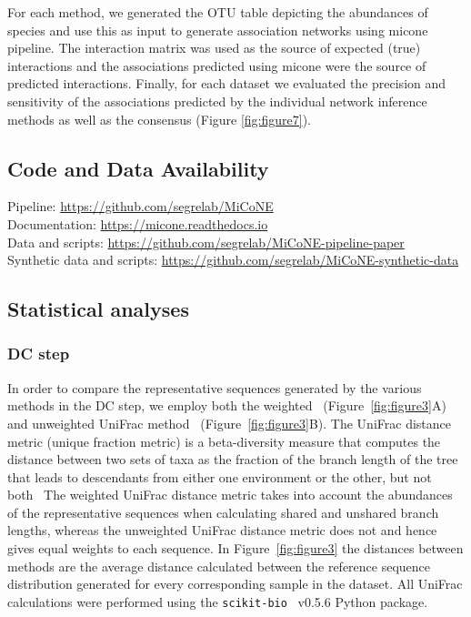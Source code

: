   For each method, we generated the OTU table depicting the abundances of species and use this as input to generate association networks using \ac{micone} pipeline.
  The interaction matrix was used as the source of expected (true) interactions and the associations predicted using \ac{micone} were the source of predicted interactions.
  Finally, for each dataset we evaluated the precision and sensitivity of the associations predicted by the individual network inference methods as well as the consensus (Figure \ref{fig:figure7}).

  \subsection*{Code and Data Availability}
  Pipeline: \href{https://github.com/segrelab/MiCoNE}{https://github.com/segrelab/MiCoNE} \\
  Documentation: \href{https://micone.readthedocs.io}{https://micone.readthedocs.io} \\
  Data and scripts: \href{https://github.com/segrelab/MiCoNE-pipeline-paper}{https://github.com/segrelab/MiCoNE-pipeline-paper} \\
  Synthetic data and scripts: \href{https://github.com/segrelab/MiCoNE-synthetic-data}{https://github.com/segrelab/MiCoNE-synthetic-data}

  \subsection*{Statistical analyses}
  \vspace{-5mm}

  \subsubsection*{DC step}
  In order to compare the representative sequences generated by the various methods in the DC step, we employ both the weighted~\cite{Lozupone2007} (Figure~\ref{fig:figure3}A) and unweighted UniFrac method~\cite{Lozupone2005} (Figure~\ref{fig:figure3}B).
  The UniFrac distance metric (unique fraction metric) is a beta-diversity measure that computes the distance between two sets of taxa as the fraction of the branch length of the tree that leads to descendants from either one environment or the other, but not both~\cite{Lozupone2005}
  The weighted UniFrac distance metric takes into account the abundances of the representative sequences when calculating shared and unshared branch lengths, whereas the unweighted UniFrac distance metric does not and hence gives equal weights to each sequence.
  In Figure~\ref{fig:figure3} the distances between methods are the average distance calculated between the reference sequence distribution generated for every corresponding sample in the dataset.
  All UniFrac calculations were performed using the \texttt{scikit-bio}~\cite{thescikit-biodevelopmentteamScikitbioBioinformaticsLibrary2022} v0.5.6 Python package.

